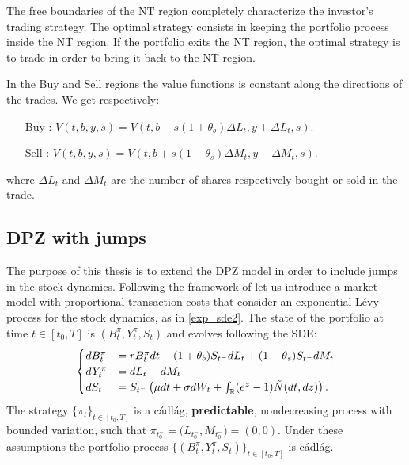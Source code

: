 The free boundaries of the NT region completely characterize the investor's trading strategy.
The optimal strategy consists in keeping the portfolio process inside the NT region. 
If the portfolio exits the NT region, the optimal strategy is to trade in order to bring it back to the NT region.

In the Buy and Sell regions the value functions is constant along the directions of the trades.
We get respectively:
\begin{itemize}
 \item[Buy]: \hspace{2em} $V(t,b,y,s) = V(t,b-s(1+\theta_b)\Delta L_t,y+\Delta L_t,s).$
 \item[Sell]: \hspace{2em} $ V(t,b,y,s) = V(t,b+s(1-\theta_s)\Delta M_t,y-\Delta M_t,s).$
\end{itemize}
where $\Delta L_t$ and $\Delta M_t$ are the number of shares respectively bought or sold in the trade.





\subsection{DPZ with jumps}\label{DPZ_j_sec}


The purpose of this thesis is to extend the DPZ model in order to include jumps in the stock dynamics. 
Following the framework of \cite{Kab16} let us introduce a market model with proportional transaction costs 
that consider an exponential Lévy process for the stock dynamics, as in \ref{exp_sde2}.
The state of the portfolio at time $t\in [t_0,T]$ is $(B^{\pi}_t,Y^{\pi}_t,S_t)$ and evolves following the SDE:
\begin{equation}\label{porfolio_dynamics}
 \begin{cases}
 dB^{\pi}_t &=  rB^{\pi}_t dt - (1+\theta_b)S_{t^-} dL_t + (1-\theta_s) S_{t^-} dM_t \\
 dY^{\pi}_t &=  dL_t - dM_t \\
 dS_t &=  S_{t^-} \left( \mu dt + \sigma dW_t + \int_{\mathbb{R}} (e^z-1) \tilde N(dt,dz) \right).
\end{cases}
\end{equation}
The strategy $\{\pi_t\}_{t \in [t_0,T]}$ is a cádlág, \textbf{predictable}, nondecreasing process with bounded variation, such that
$ \pi_{t_0^-} = \bigl ( L_{t_0^-} , M_{t_0^-} \bigr ) = (0,0)$.
Under these assumptions the portfolio process 
$\bigl \{(B^{\pi}_t,Y^{\pi}_t,S_t)\bigr \}_{t \in [t_0,T]}$ is cádlág.


